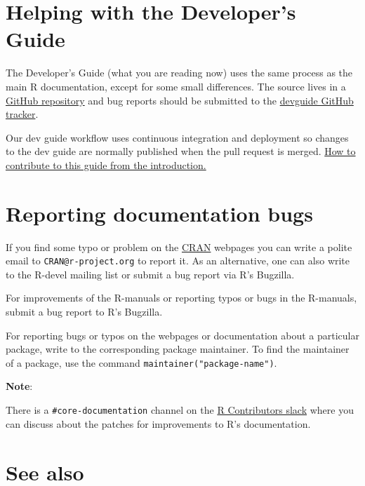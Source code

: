 \documentclass[
]{book}
\begin{document}
\hypertarget{helping-with-the-developers-guide}{%
\section{Helping with the Developer's Guide}\label{helping-with-the-developers-guide}}

The Developer's Guide (what you are reading now) uses the same process as the main R documentation, except for some small differences. The source lives in a \href{https://github.com/r-devel/rdevguide/}{GitHub repository} and bug reports should be submitted to the \href{https://github.com/r-devel/rdevguide/issues}{devguide GitHub tracker}.

Our dev guide workflow uses continuous integration and deployment so changes to the dev guide are normally published when the pull request is merged. \protect\hyperlink{how-to-contribute-to-this-guide}{How to contribute to this guide from the introduction.}

\hypertarget{reporting-documentation-bugs}{%
\section{Reporting documentation bugs}\label{reporting-documentation-bugs}}

If you find some typo or problem on the \href{https://cran.r-project.org}{CRAN} webpages you can write a polite email to \texttt{CRAN@r-project.org} to report it. As an alternative, one can also write to the R-devel mailing list or submit a bug report via R's Bugzilla.

For improvements of the R-manuals or reporting typos or bugs in the R-manuals, submit a bug report to R's Bugzilla.

For reporting bugs or typos on the webpages or documentation about a particular package, write to the corresponding package maintainer. To find the maintainer of a package, use the command \texttt{maintainer("package-name")}.

\textbf{Note}:

There is a \texttt{\#core-documentation} channel on the \href{https://r-contributors.slack.com/}{R Contributors slack} where you can discuss about the patches for improvements to R's documentation.

\hypertarget{see-also-5}{%
\section{See also}\label{see-also-5}}
\end{document}
